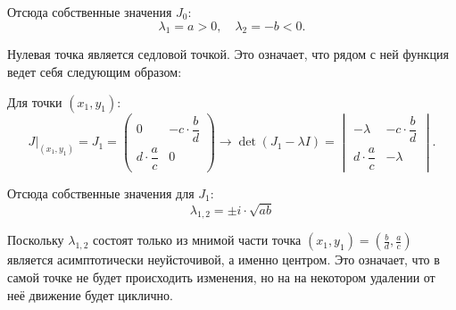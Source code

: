 	Отсюда собственные значения \( J_0 \):
	\begin{equation*}
		\lambda_1 = a > 0, \quad \lambda_2 = -b < 0.
	\end{equation*}

	Нулевая точка является седловой точкой. Это означает, что рядом с ней функция ведет себя следующим образом: 

	Для точки \( (x_1, y_1) \):
	\begin{equation*}
		J|_{(x_1, y_1)}  = J_1 = 
		\begin{pmatrix}
			 0 & -c \cdot \dfrac{b}{d} \\
			 d \cdot \dfrac{a}{c} & 0
		\end{pmatrix} 
		\rightarrow 
		\det (J_1 - \lambda I ) = 
		\begin{vmatrix}
			 - \lambda & -c \cdot \dfrac{b}{d} \\
			 d \cdot \dfrac{a}{c} & - \lambda
		\end{vmatrix} .
	\end{equation*}

	Отсюда собственные значения для \( J_1 \):
	\begin{equation*}
		\lambda_{1, 2} = \pm i \cdot \sqrt{a b}
	\end{equation*}

	Поскольку \( \lambda_{1, 2} \) состоят только из мнимой части точка \( (x_1, y_1) = \left(\frac{b}{d}, \frac{a}{c} \right) \) является асимптотически неуйсточивой, а именно центром. Это означает, что в самой точке не будет происходить изменения, но на на некотором удалении от неё  движение будет циклично.


\pagebreak